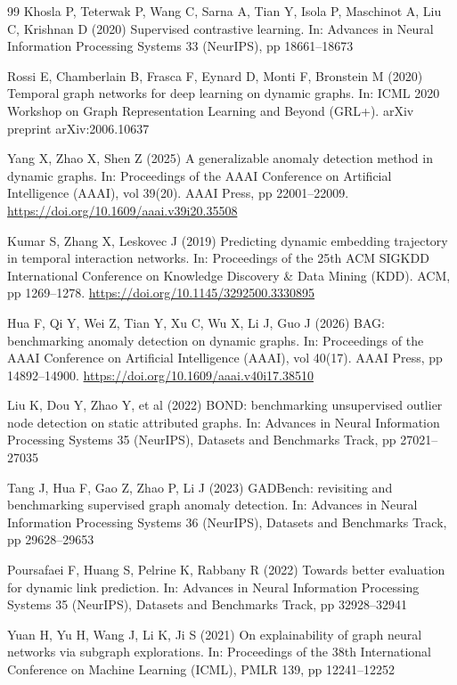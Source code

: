 \documentclass[pdflatex,sn-basic]{sn-jnl}
\theoremstyle{definition}
\theoremstyle{plain}
\begin{document}
\begin{thebibliography}{99}
Khosla P, Teterwak P, Wang C, Sarna A, Tian Y, Isola P, Maschinot A, Liu C, Krishnan D (2020) Supervised contrastive learning. In: Advances in Neural Information Processing Systems 33 (NeurIPS), pp 18661--18673

Rossi E, Chamberlain B, Frasca F, Eynard D, Monti F, Bronstein M (2020) Temporal graph networks for deep learning on dynamic graphs. In: ICML 2020 Workshop on Graph Representation Learning and Beyond (GRL+). arXiv preprint arXiv:2006.10637

Yang X, Zhao X, Shen Z (2025) A generalizable anomaly detection method in dynamic graphs. In: Proceedings of the AAAI Conference on Artificial Intelligence (AAAI), vol 39(20). AAAI Press, pp 22001--22009. \url{https://doi.org/10.1609/aaai.v39i20.35508}

Kumar S, Zhang X, Leskovec J (2019) Predicting dynamic embedding trajectory in temporal interaction networks. In: Proceedings of the 25th ACM SIGKDD International Conference on Knowledge Discovery \& Data Mining (KDD). ACM, pp 1269--1278. \url{https://doi.org/10.1145/3292500.3330895}

Hua F, Qi Y, Wei Z, Tian Y, Xu C, Wu X, Li J, Guo J (2026) BAG: benchmarking anomaly detection on dynamic graphs. In: Proceedings of the AAAI Conference on Artificial Intelligence (AAAI), vol 40(17). AAAI Press, pp 14892--14900. \url{https://doi.org/10.1609/aaai.v40i17.38510}

Liu K, Dou Y, Zhao Y, et al (2022) BOND: benchmarking unsupervised outlier node detection on static attributed graphs. In: Advances in Neural Information Processing Systems 35 (NeurIPS), Datasets and Benchmarks Track, pp 27021--27035

Tang J, Hua F, Gao Z, Zhao P, Li J (2023) GADBench: revisiting and benchmarking supervised graph anomaly detection. In: Advances in Neural Information Processing Systems 36 (NeurIPS), Datasets and Benchmarks Track, pp 29628--29653

Poursafaei F, Huang S, Pelrine K, Rabbany R (2022) Towards better evaluation for dynamic link prediction. In: Advances in Neural Information Processing Systems 35 (NeurIPS), Datasets and Benchmarks Track, pp 32928--32941

Yuan H, Yu H, Wang J, Li K, Ji S (2021) On explainability of graph neural networks via subgraph explorations. In: Proceedings of the 38th International Conference on Machine Learning (ICML), PMLR 139, pp 12241--12252


\end{thebibliography}
\end{document}

